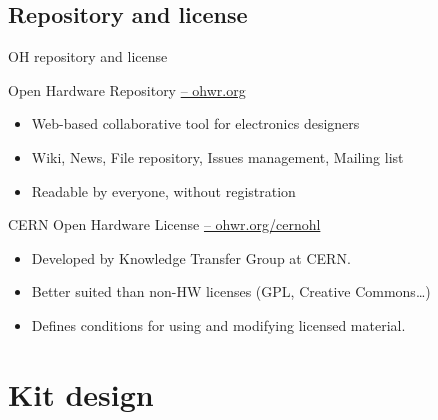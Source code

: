\documentclass[compress,red]{beamer}
\begin{document}
\subsection{Repository and license}

\begin{frame}{OH repository and license}

  \begin{block}{Open Hardware Repository \href{http://ohwr.org}{-- ohwr.org}}
    \begin{itemize}
    \item Web-based collaborative tool for electronics designers
    \item Wiki, News, File repository, Issues management, Mailing list
    \item Readable by everyone, without registration
   \end{itemize}
  \end{block}

  \begin{block}{CERN Open Hardware License \href{http://ohwr.org/cernohl}{-- ohwr.org/cernohl}}
    \begin{itemize}
    \item Developed by Knowledge Transfer Group at CERN.
    \item Better suited than non-HW licenses (GPL, Creative Commons\dots)
    \item Defines conditions for using and modifying licensed material.
   \end{itemize}
  \end{block}


\end{frame}



\section{Kit design}
\end{document}

